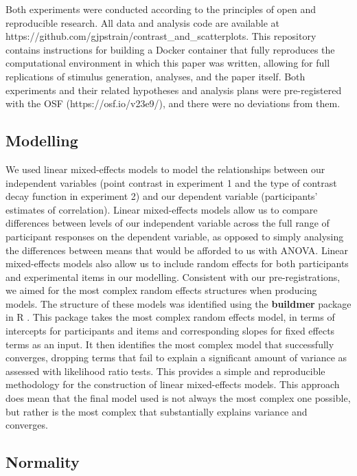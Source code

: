 \documentclass[preprint, 3p,
authoryear]{elsarticle} %
\begin{document}
Both experiments were conducted according to the principles of open and
reproducible research. All data and analysis code are available at
https://github.com/gjpstrain/contrast\_and\_scatterplots. This
repository contains instructions for building a Docker container that
fully reproduces the computational environment in which this paper was
written, allowing for full replications of stimulus generation,
analyses, and the paper itself. Both experiments and their related
hypotheses and analysis plans were pre-registered with the OSF
(https://osf.io/v23e9/), and there were no deviations from them.

\hypertarget{modelling}{%
\subsection{Modelling}\label{modelling}}

We used linear mixed-effects models to model the relationships between
our independent variables (point contrast in experiment 1 and the type
of contrast decay function in experiment 2) and our dependent variable
(participants' estimates of correlation). Linear mixed-effects models
allow us to compare differences between levels of our independent
variable across the full range of participant responses on the dependent
variable, as opposed to simply analysing the differences between means
that would be afforded to us with ANOVA. Linear mixed-effects models
also allow us to include random effects for both participants and
experimental items in our modelling. Consistent with our
pre-registrations, we aimed for the most complex random effects
structures when producing models. The structure of these models was
identified using the \textbf{buildmer} package in R
\citep{voeten_buildmer_2022}. This package takes the most complex random
effects model, in terms of intercepts for participants and items and
corresponding slopes for fixed effects terms as an input. It then
identifies the most complex model that successfully converges, dropping
terms that fail to explain a significant amount of variance as assessed
with likelihood ratio tests. This provides a simple and reproducible
methodology for the construction of linear mixed-effects models. This
approach does mean that the final model used is not always the most
complex one possible, but rather is the most complex that substantially
explains variance and converges.

\hypertarget{normality}{%
\subsection{Normality}\label{normality}}
\end{document}
